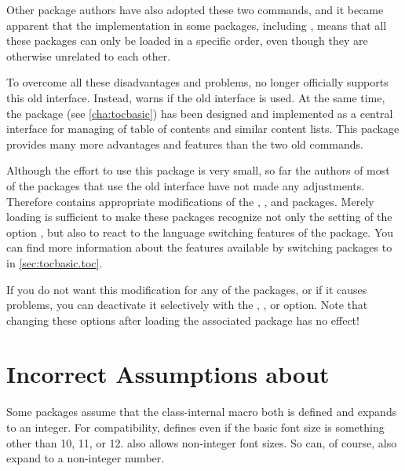 Other package authors have also adopted these two commands, and it became
apparent that the implementation in some packages, including ,
means that all these packages can only be loaded in a specific order, even
though they are otherwise unrelated to each other.

To overcome all these disadvantages and problems, \KOMAScript{} no longer
officially supports this old interface. Instead, \KOMAScript{} warns if the
old interface is used. At the same time, the
package (see \autoref{cha:tocbasic}) has been designed and implemented as a
central interface for managing of table of contents and similar content lists.
This package provides many more advantages and features than the two old
commands.

Although the effort to use this package is very small, so far the authors of
most of the packages that use the old interface have not made any adjustments.
Therefore  contains appropriate modifications of the
,
, and
 packages. Merely loading
 is sufficient to make these packages recognize not only the
setting of the \KOMAScript{} option
, but also
to react to the language switching features of the
 package. You can find more information
about the features available by switching packages to  in
\autoref{sec:tocbasic.toc}.

If you do not want this modification for any of the packages, or if it causes
problems, you can deactivate it selectively with the
,
,
or
option. Note that changing these options after loading
the associated package has no effect!


\section{Incorrect Assumptions about }

Some packages assume that the class-internal macro
 both is defined and expands to an integer.
For compatibility, \KOMAScript{} defines  even if the basic
font size is something other than 10, 11, or 12.
\KOMAScript{} also allows non-integer font sizes. So  can, of
course, also expand to a non-integer number.

